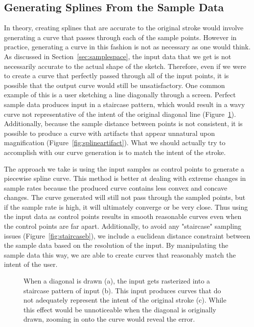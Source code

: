 \subsection{Generating Splines From the Sample Data}
In theory, creating splines that are accurate to the original stroke would involve generating a curve that passes through each of the sample points.
However in practice, generating a curve in this fashion is not as necessary as one would think. 
As discussed in Section~\ref{sec:samplespace}, the input data that we get is not necessarily accurate to the actual shape of the sketch.
Therefore, even if we were to create a curve that perfectly passed through all of the input points, it is possible that the output curve would still be unsatisfactory.
One common example of this is a user sketching a line diagonally through a screen.
Perfect sample data produces input in a staircase pattern, which would result in a wavy curve not representative of the intent of the original diagonal line (Figure~\ref{fig:staircase}).
Additionally, because the sample distance between points is not consistent, it is possible to produce a curve with artifacts that appear unnatural upon magnification (Figure~\ref{fig:splineartifact}).
What we should actually try to accomplish with our curve generation is to match the intent of the stroke.


The approach we take is using the input samples as control points to generate a piecewise spline curve. 
This method is better at dealing with extreme changes in sample rates because the produced curve contains less convex and concave changes. 
The curve generated will still not pass through the sampled points, but if the sample rate is high, it will ultimately converge or be very close.
Thus using the input data as control points results in smooth reasonable curves even when the control points are far apart.
Additionally, to avoid any "staircase" sampling issues (Figure~\ref{fig:staircaseb}), we include a euclidean distance constraint between the sample data based on the resolution of the input. 
By manipulating the sample data this way, we are able to create curves that reasonably match the intent of the user.

\begin{figure}
\begin{center}
\end{center}
\caption[Errors in spline generation from how strokes are sampled]{When a diagonal is drawn (a), the input gets rasterized into a staircase pattern of input (b). This input produces curves that do not adequately represent the intent of the original stroke (c). While this effect would be unnoticeable when the diagonal is originally drawn, zooming in onto the curve would reveal the error.}
\label{fig:staircase}
\end{figure}

